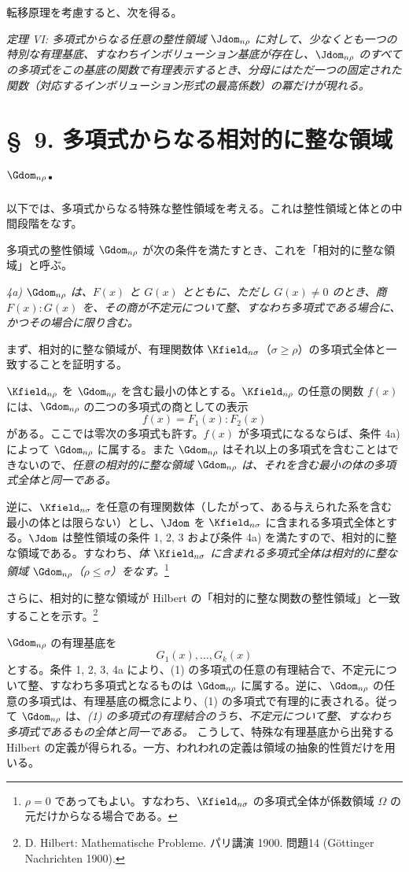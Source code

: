 \documentclass[11pt]{article}
\begin{document}
転移原理を考慮すると、次を得る。

\emph{定理 VI: 多項式からなる任意の整性領域 $\Jdom_{n\rho}$ に対して、少なくとも一つの特別な有理基底、すなわちインボリューション基底が存在し、$\Jdom_{n\rho}$ のすべての多項式をこの基底の関数で有理表示するとき、分母にはただ一つの固定された関数（対応するインボリューション形式の最高係数）の冪だけが現れる。}

\section*{\S\ 9. 多項式からなる相対的に整な領域 $\Gdom_{n\rho}$.}

以下では、多項式からなる特殊な整性領域を考える。これは整性領域と体との中間段階をなす。

多項式の整性領域 $\Gdom_{n\rho}$ が次の条件を満たすとき、これを「相対的に整な領域」と呼ぶ。

\emph{4a) $\Gdom_{n\rho}$ は、$F(x)$ と $G(x)$ とともに、ただし $G(x)\ne0$ のとき、商 $F(x):G(x)$ を、その商が不定元について整、すなわち多項式である場合に、かつその場合に限り含む。}

まず、相対的に整な領域が、有理関数体 $\Kfield_{n\sigma}$（$\sigma\ge\rho$）の多項式全体と一致することを証明する。

$\Kfield_{n\rho}$ を $\Gdom_{n\rho}$ を含む最小の体とする。$\Kfield_{n\rho}$ の任意の関数 $f(x)$ には、$\Gdom_{n\rho}$ の二つの多項式の商としての表示
\[
  f(x)=F_1(x):F_2(x)
\]
がある。ここでは零次の多項式も許す。$f(x)$ が多項式になるならば、条件 4a) によって $\Gdom_{n\rho}$ に属する。また $\Gdom_{n\rho}$ はそれ以上の多項式を含むことはできないので、\emph{任意の相対的に整な領域 $\Gdom_{n\rho}$ は、それを含む最小の体の多項式全体と同一である。}

逆に、$\Kfield_{n\sigma}$ を任意の有理関数体（したがって、ある与えられた系を含む最小の体とは限らない）とし、$\Jdom$ を $\Kfield_{n\sigma}$ に含まれる多項式全体とする。$\Jdom$ は整性領域の条件 1, 2, 3 および条件 4a) を満たすので、相対的に整な領域である。すなわち、\emph{体 $\Kfield_{n\sigma}$ に含まれる多項式全体は相対的に整な領域 $\Gdom_{n\rho}$（$\rho\le\sigma$）をなす。}\footnote{$\rho=0$ であってもよい。すなわち、$\Kfield_{n\sigma}$ の多項式全体が係数領域 $\Omega$ の元だけからなる場合である。}

さらに、相対的に整な領域が Hilbert の「相対的に整な関数の整性領域」と一致することを示す。\footnote{D. Hilbert: Mathematische Probleme. パリ講演 1900. 問題14 (Göttinger Nachrichten 1900).}

$\Gdom_{n\rho}$ の有理基底を
\begin{equation}
  G_1(x),\ldots,G_k(x)
\tag{1}
\end{equation}
とする。条件 1, 2, 3, 4a により、(1) の多項式の任意の有理結合で、不定元について整、すなわち多項式となるものは $\Gdom_{n\rho}$ に属する。逆に、$\Gdom_{n\rho}$ の任意の多項式は、有理基底の概念により、(1) の多項式で有理的に表される。従って $\Gdom_{n\rho}$ は、\emph{(1) の多項式の有理結合のうち、不定元について整、すなわち多項式であるもの全体と同一である。} こうして、特殊な有理基底から出発する Hilbert の定義が得られる。一方、われわれの定義は領域の抽象的性質だけを用いる。
\end{document}
